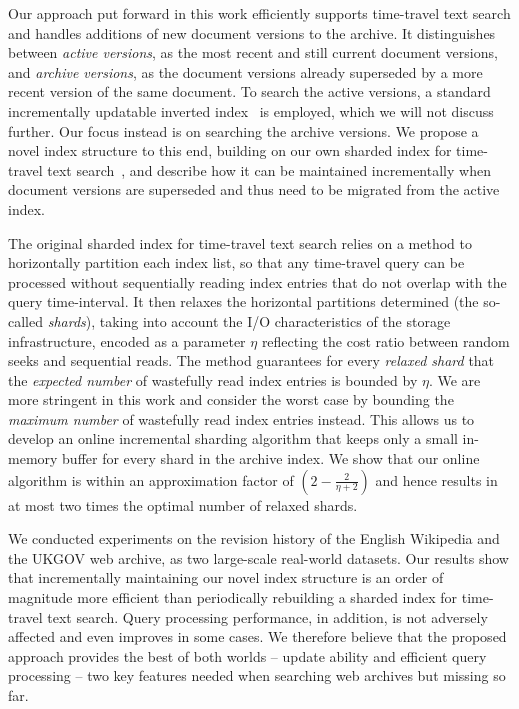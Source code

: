 
Our approach put forward in this work efficiently supports time-travel
text search and handles additions of new document versions to the
archive. It distinguishes between \textit{active versions}, as the
most recent and still current document versions, and \textit{archive
  versions}, as the document versions already superseded by a more
recent version of the same document. To search the active versions, a
standard incrementally updatable inverted
index~\cite{Buttcher:2008fk,Lester:2008qf} is employed, which we will
not discuss further. Our focus instead is on searching the archive
versions. We propose a novel index structure to this end, building on
our own sharded index for time-travel text
search~\cite{aanand:sigir2011}, and describe how it can be maintained
incrementally when document versions are superseded and thus need to
be migrated from the active index.

The original sharded index for time-travel text search relies on a
method to horizontally partition each index list, so that any
time-travel query can be processed without sequentially reading index
entries that do not overlap with the query time-interval. It then
relaxes the horizontal partitions determined (the so-called
\textit{shards}), taking into account the I/O characteristics of the
storage infrastructure, encoded as a parameter $\eta$ reflecting the
cost ratio between random seeks and sequential reads. The method
guarantees for every \textit{relaxed shard} that the \textit{expected
  number} of wastefully read index entries is bounded by $\eta$. We
are more stringent in this work and consider the worst case by
bounding the \textit{maximum number} of wastefully read index entries
instead. This allows us to develop an online incremental sharding
algorithm that keeps only a small in-memory buffer for every shard in
the archive index. We show that our online algorithm is within an
approximation factor of $(2 - \frac{2}{\eta + 2})$ and hence results
in at most two times the optimal number of relaxed shards.

We conducted experiments on the revision history of the English
Wikipedia and the UKGOV web archive, as two large-scale real-world
datasets. Our results show that incrementally maintaining our novel
index structure is an order of magnitude more efficient than
periodically rebuilding a sharded index for time-travel text
search. Query processing performance, in addition, is not adversely
affected and even improves in some cases. We therefore believe that
the proposed approach provides the best of both worlds -- update
ability and efficient query processing -- two key features needed when
searching web archives but missing so far.

